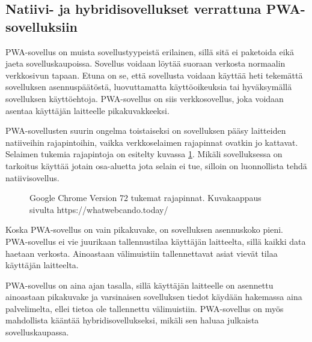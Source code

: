 \documentclass{tktltiki}
\begin{document}
\subsection{Natiivi- ja hybridisovellukset verrattuna PWA-sovelluksiin}

PWA-sovellus on muista sovellustyypeistä erilainen, sillä sitä ei paketoida eikä jaeta sovelluskaupoissa. Sovellus voidaan löytää suoraan verkosta normaalin verkkosivun tapaan. Etuna on se, että sovellusta voidaan käyttää heti tekemättä sovelluksen asennuspäätöstä, luovuttamatta käyttöoikeuksia tai hyväksymällä sovelluksen käyttöehtoja. PWA-sovellus on siis verkkosovellus, joka voidaan asentaa käyttäjän laitteelle pikakuvakkeeksi. 

PWA-sovellusten suurin ongelma toistaiseksi on sovelluksen pääsy laitteiden natiiveihin rajapintoihin, vaikka verkkoselaimen rajapinnat ovatkin jo kattavat. Selaimen tukemia rajapintoja on esitelty kuvassa \ref{Selaimen rajapinnat}. Mikäli sovelluksessa on tarkoitus käyttää jotain osa-aluetta jota selain ei tue, silloin on luonnollista tehdä natiivisovellus.

\begin{figure}[h]
\begin{center}
\caption{Google Chrome Version 72 tukemat rajapinnat. Kuvakaappaus sivulta https://whatwebcando.today/ }
\label{Selaimen rajapinnat}
\end{center}
\end{figure}
\clearpage

Koska PWA-sovellus on vain pikakuvake, on sovelluksen asennuskoko pieni. PWA-sovellus ei vie juurikaan tallennustilaa käyttäjän laitteelta, sillä kaikki data haetaan verkosta. Ainoastaan välimuistiin tallennettavat asiat vievät tilaa käyttäjän laitteelta.

PWA-sovellus on aina ajan tasalla, sillä käyttäjän laitteelle on asennettu ainoastaan pikakuvake ja varsinaisen sovelluksen tiedot käydään hakemassa aina palvelimelta, ellei tietoa ole tallennettu välimuistiin. PWA-sovellus on myös mahdollista kääntää hybridisovellukseksi, mikäli sen haluaa julkaista sovelluskaupassa. 
\end{document}
